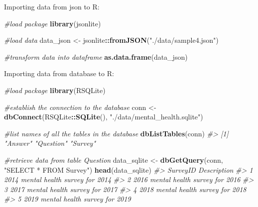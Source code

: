 \documentclass[
]{book}
\newenvironment{Shaded}{\begin{snugshade}}{\end{snugshade}}
\newcommand{\CommentTok}[1]{\textcolor[rgb]{0.56,0.35,0.01}{\textit{#1}}}
\newcommand{\FunctionTok}[1]{\textcolor[rgb]{0.13,0.29,0.53}{\textbf{#1}}}
\newcommand{\NormalTok}[1]{#1}
\newcommand{\OtherTok}[1]{\textcolor[rgb]{0.56,0.35,0.01}{#1}}
\newcommand{\SpecialCharTok}[1]{\textcolor[rgb]{0.81,0.36,0.00}{\textbf{#1}}}
\newcommand{\StringTok}[1]{\textcolor[rgb]{0.31,0.60,0.02}{#1}}
\begin{document}
Importing data from json to R:

\begin{Shaded}
\begin{Highlighting}[]
\CommentTok{\#load package}
\FunctionTok{library}\NormalTok{(jsonlite)}

\CommentTok{\#load data}
\NormalTok{data\_json }\OtherTok{\textless{}{-}}\NormalTok{ jsonlite}\SpecialCharTok{::}\FunctionTok{fromJSON}\NormalTok{(}\StringTok{"./data/sample4.json"}\NormalTok{)}

\CommentTok{\#transform data into dataframe}
\FunctionTok{as.data.frame}\NormalTok{(data\_json)}
\end{Highlighting}
\end{Shaded}

Importing data from database to R:

\begin{Shaded}
\begin{Highlighting}[]
\CommentTok{\#load package}
\FunctionTok{library}\NormalTok{(RSQLite)}

\CommentTok{\#establish the connection to the database}
\NormalTok{conn }\OtherTok{\textless{}{-}} \FunctionTok{dbConnect}\NormalTok{(RSQLite}\SpecialCharTok{::}\FunctionTok{SQLite}\NormalTok{(), }\StringTok{"./data/mental\_health.sqlite"}\NormalTok{)}

\CommentTok{\#list names of all the tables in the database}
\FunctionTok{dbListTables}\NormalTok{(conn)}
\CommentTok{\#\textgreater{} [1] "Answer"   "Question" "Survey"}
\end{Highlighting}
\end{Shaded}

\begin{Shaded}
\begin{Highlighting}[]
\CommentTok{\#retrieve data from table Question}
\NormalTok{data\_sqlite }\OtherTok{\textless{}{-}} \FunctionTok{dbGetQuery}\NormalTok{(conn, }\StringTok{"SELECT * FROM Survey"}\NormalTok{)}
\FunctionTok{head}\NormalTok{(data\_sqlite)}
\CommentTok{\#\textgreater{}   SurveyID                   Description}
\CommentTok{\#\textgreater{} 1     2014 mental health survey for 2014}
\CommentTok{\#\textgreater{} 2     2016 mental health survey for 2016}
\CommentTok{\#\textgreater{} 3     2017 mental health survey for 2017}
\CommentTok{\#\textgreater{} 4     2018 mental health survey for 2018}
\CommentTok{\#\textgreater{} 5     2019 mental health survey for 2019}
\end{Highlighting}
\end{Shaded}
\end{document}
